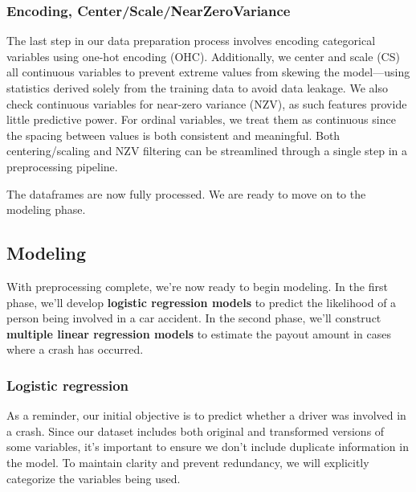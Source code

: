\documentclass[
]{article}
\begin{document}
\subsubsection{Encoding,
Center/Scale/NearZeroVariance}\label{encoding-centerscalenearzerovariance}

The last step in our data preparation process involves encoding
categorical variables using one-hot encoding (OHC). Additionally, we
center and scale (CS) all continuous variables to prevent extreme values
from skewing the model---using statistics derived solely from the
training data to avoid data leakage. We also check continuous variables
for near-zero variance (NZV), as such features provide little predictive
power. For ordinal variables, we treat them as continuous since the
spacing between values is both consistent and meaningful. Both
centering/scaling and NZV filtering can be streamlined through a single
step in a preprocessing pipeline.

The dataframes are now fully processed. We are ready to move on to the
modeling phase.

\subsection{Modeling}\label{modeling}

With preprocessing complete, we're now ready to begin modeling. In the
first phase, we'll develop \textbf{logistic regression models} to
predict the likelihood of a person being involved in a car accident. In
the second phase, we'll construct \textbf{multiple linear regression
models} to estimate the payout amount in cases where a crash has
occurred.

\subsubsection{Logistic regression}\label{logistic-regression}

As a reminder, our initial objective is to predict whether a driver was
involved in a crash. Since our dataset includes both original and
transformed versions of some variables, it's important to ensure we
don't include duplicate information in the model. To maintain clarity
and prevent redundancy, we will explicitly categorize the variables
being used.
\end{document}
